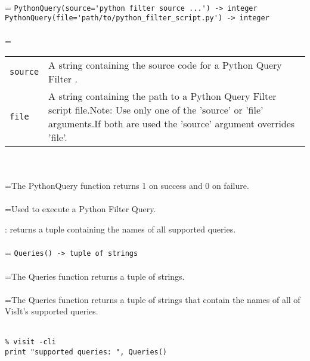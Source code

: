\documentclass[10pt,a4paper]{report}
\begin{document}
 \\ 
\hangindent=\parindent 
\verb!PythonQuery(source='python filter source ...') -> integer!\\ 
\verb!PythonQuery(file='path/to/python_filter_script.py') -> integer!\\ [-3mm]

 \\ 
\hangindent=\parindent 
\begin{tabular}{lp{9cm}}
\verb!source! & A string containing the source code for a Python Query Filter . \\
\verb!file! & A string containing the path to a Python Query Filter script file.Note: Use only one of the 'source' or 'file' arguments.If both are used the 'source' argument overrides 'file'. \\
\end{tabular} \\[-2mm]


 \\ 
\hangindent=\parindent The PythonQuery function returns 1 on success and 0 on failure. \\[-3mm] 

 \\ 
\hangindent=\parindent Used to execute a Python Filter Query. \\[-3mm] 

\newpage


{}
: returns a tuple containing the names of all supported queries.\\[-3mm]

 \\ 
\hangindent=\parindent 
\verb!Queries() -> tuple of strings!\\ [-3mm]

 \\ 
\hangindent=\parindent The Queries function returns a tuple of strings. \\[-3mm] 

 \\ 
\hangindent=\parindent The Queries function returns a tuple of strings that contain the names of all of VisIt's supported queries. \\[-3mm] 

\\[-6mm]
\begin{verbatim}% visit -cli
print "supported queries: ", Queries()
\end{verbatim}
\newpage
\end{document}

